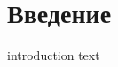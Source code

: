 \documentclass[../doc.tex]{subfiles}
\begin{document}
\section*{Введение}
introduction text
\end{document}
